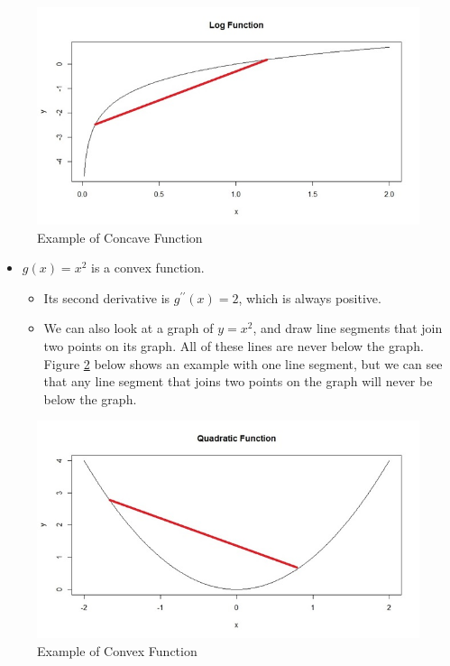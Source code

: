 \documentclass[
]{book}
\providecommand{\tightlist}{%
  \setlength{\itemsep}{0pt}\setlength{\parskip}{0pt}}
\begin{document}
\begin{figure}
\centering
\includegraphics{images/06-concave.jpeg}
\caption{\label{fig:concave}Example of Concave Function}
\end{figure}

\begin{itemize}
\tightlist
\item
  \(g(x) = x^2\) is a convex function.

  \begin{itemize}
  \tightlist
  \item
    Its second derivative is \(g^{\prime \prime}(x) = 2\), which is always positive.
  \item
    We can also look at a graph of \(y = x^2\), and draw line segments that join two points on its graph. All of these lines are never below the graph. Figure \ref{fig:convex} below shows an example with one line segment, but we can see that any line segment that joins two points on the graph will never be below the graph.
  \end{itemize}
\end{itemize}

\begin{figure}
\centering
\includegraphics{images/06-convex.jpeg}
\caption{\label{fig:convex}Example of Convex Function}
\end{figure}
\end{document}
